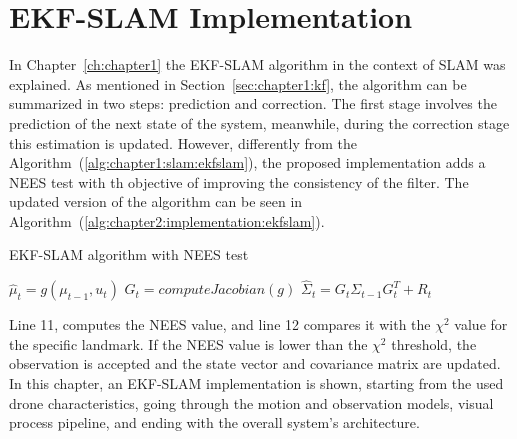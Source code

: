 \chapter{EKF-SLAM Implementation}
\label{ch:chapter2}
In Chapter~\ref{ch:chapter1} the EKF-SLAM algorithm in the context of \ac{SLAM} was explained. As mentioned in Section~\ref{sec:chapter1:kf}, the algorithm can be summarized in two steps: prediction and correction. The first stage involves the prediction of the next state of the system, meanwhile, during the correction stage this estimation is updated. However, differently from the Algorithm~(\ref{alg:chapter1:slam:ekfslam}), the proposed implementation adds a \ac{NEES} test with th objective of improving the consistency of the filter. The updated version of the algorithm can be seen in Algorithm~(\ref{alg:chapter2:implementation:ekfslam}).\\
\begin{algorithm}[h]
    \caption{EKF-SLAM algorithm with NEES test}
    \label{alg:chapter2:implementation:ekfslam}
    \BlankLine
    \BlankLine
    $\hat\mu_t = g\left(\mu_{t-1}, u_t\right)$\;
    $G_t = computeJacobian\left(g\right)$\;
    $\hat\Sigma_t = G_t \Sigma_{t-1} G_t^T + R_t$\;
    \BlankLine
    \BlankLine
\end{algorithm}

Line 11, computes the \ac{NEES} value, and line 12 compares it with the $\chi^2$ value for the specific landmark. If the \ac{NEES} value is lower than the $\chi^2$ threshold, the observation is accepted and the state vector and covariance matrix are updated.\\

In this chapter, an EKF-SLAM implementation is shown, starting from the used drone characteristics, going through the motion and observation models, visual process pipeline, and ending with the overall system's architecture.


